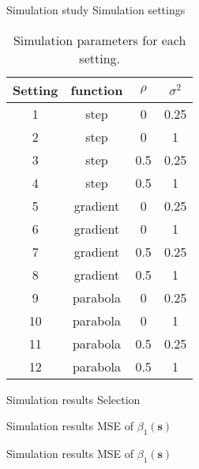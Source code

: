 \documentclass[12pt,t]{beamer}
\newcommand{\subt}[1]{{\footnotesize \color{subtitle} {#1}}}
\begin{document}
\begin{frame}{Simulation study}
\subt{Simulation settings}
    \begin{table}[h!]
        \begin{center}
        \begin{tabular}{cccc}
            \hline
            Setting & function & $\rho$ & $\sigma^2$ \\ 
            \hline
            1 & step & 0 & 0.25 \\ 
            2 & step & 0 & 1 \\ 
            3 & step & 0.5 & 0.25 \\ 
            4 & step & 0.5 & 1 \\ 
            \hline
            5 & gradient & 0 & 0.25 \\ 
            6 & gradient & 0 & 1 \\ 
            7 & gradient & 0.5 & 0.25 \\ 
            8 & gradient & 0.5 & 1 \\ 
            \hline
            9 & parabola & 0 & 0.25 \\ 
            10 & parabola & 0 & 1 \\ 
            11 & parabola & 0.5 & 0.25 \\ 
            12 & parabola & 0.5 & 1 
        \end{tabular}
        \end{center}
        \caption{Simulation parameters for each setting.\label{table:simulation_settings}}
    \end{table}
\end{frame}


\begin{frame}{Simulation results}
\subt{Selection}

\end{frame}




\begin{frame}{Simulation results}
\subt{MSE of $\beta_1(\bm{s})$}

\end{frame}



\begin{frame}{Simulation results}
\subt{MSE of $\beta_1(\bm{s})$}

\end{frame}
\end{document}
